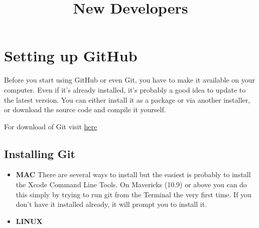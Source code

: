 \documentclass[12pt]{article} %
\title{New Developers}
\begin{document}
\section{Setting up GitHub}
Before you start using GitHub or even Git, you have to make it available on your computer. Even if it’s already installed, it’s probably a good idea to update to the latest version. You can either install it as a package or via another installer, or download the source code and compile it yourself.

For download of Git visit \href{http://git-scm.com/downloads} {here}

\subsection{Installing Git}

\begin{itemize}
\item \textbf{MAC} 
There are several ways to install but the easiest is probably to install the Xcode Command Line Tools. On Mavericks (10.9) or above you can do this simply by trying to run git from the Terminal the very first time. If you don’t have it installed already, it will prompt you to install it.
\item \textbf{LINUX}


\end{itemize}
\end{document}
